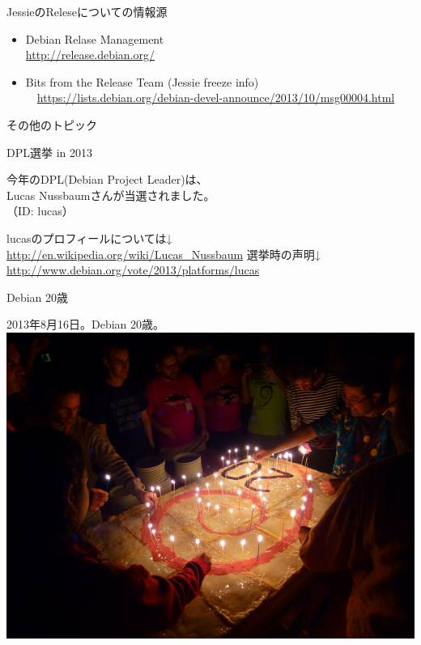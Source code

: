 \begin{frame}{JessieのReleseについての情報源}

 \begin{itemize}
 \item Debian Relase Management\\
  \url{http://release.debian.org/}
 \item  Bits from the Release Team (Jessie freeze info)\\
　\url{https://lists.debian.org/debian-devel-announce/2013/10/msg00004.html}
 \end{itemize}

\end{frame}


\begin{frame}
\begin{center}
\LARGE{その他のトピック}
\end{center}
\end{frame}

\begin{frame}{DPL選挙 in 2013}
\begin{center}
\LARGE
今年のDPL(Debian Project Leader)は、\\
Lucas Nussbaumさんが当選されました。\\
（ID: lucas）
\end{center}
lucasのプロフィールについては↓\\
\url{http://en.wikipedia.org/wiki/Lucas_Nussbaum}
選挙時の声明↓\\
\url{http://www.debian.org/vote/2013/platforms/lucas}
\end{frame}

\begin{frame}{Debian 20歳}
\begin{center}

\Large{2013年8月16日。Debian 20歳。}\\
\includegraphics[width=0.8\hsize]{image201310/debian-20years.png}
\end{center}
\end{frame}

